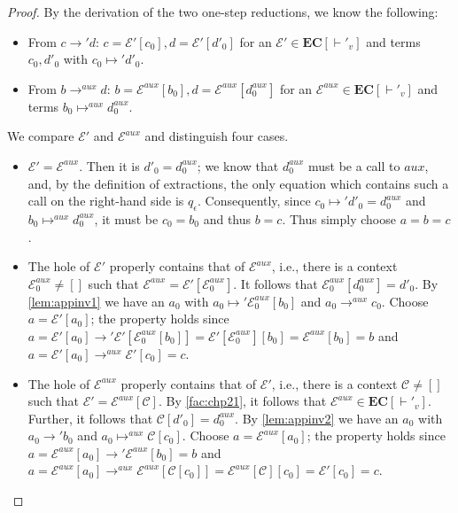 \comminv*
\begin{proof}

By the derivation of the two one-step reductions, we know the following:
\begin{itemize}
\item From $c \longrightarrow' d$: $c = \mathcal{E}'[c_0], d = \mathcal{E}'[d'_0]$ for an $\mathcal{E}' \in \mathbf{EC}[\vdash'_v]$ and terms $c_0, d'_0$ with $c_0 \mapsto' d'_0$.

\item From $b \longrightarrow^{aux} d$: $b = \mathcal{E}^{aux}[b_0], d = \mathcal{E}^{aux}[d^{aux}_0]$ for an $\mathcal{E}^{aux} \in \mathbf{EC}[\vdash'_v]$ and terms $b_0 \mapsto^{aux} d^{aux}_0$.
\end{itemize}

We compare $\mathcal{E}'$ and $\mathcal{E}^{aux}$ and distinguish four cases.

\begin{itemize}
\item $\mathcal{E}' = \mathcal{E}^{aux}$. Then it is $d'_0 = d^{aux}_0$; we know that $d^{aux}_0$ must be a call to $aux$, and, by the definition of extractions, the only equation which contains such a call on the right-hand side is $q_\epsilon$. Consequently, since $c_0 \mapsto' d'_0 = d^{aux}_0$ and $b_0 \mapsto^{aux} d^{aux}_0$, it must be $c_0 = b_0$ and thus $b = c$. Thus simply choose $a = b = c$.

\item The hole of $\mathcal{E}'$ properly contains that of $\mathcal{E}^{aux}$, i.e., there is a context $\mathcal{E}^{aux}_0 \neq []$ such that $\mathcal{E}^{aux} = \mathcal{E}'[\mathcal{E}^{aux}_0]$. It follows that $\mathcal{E}^{aux}_0[d^{aux}_0] = d'_0$. By \autoref{lem:appinv1} we have an $a_0$ with $a_0 \mapsto' \mathcal{E}^{aux}_0[b_0]$ and $a_0 \longrightarrow^{aux} c_0$. Choose $a = \mathcal{E}'[a_0]$; the property holds since $a = \mathcal{E}'[a_0] \longrightarrow' \mathcal{E}'[\mathcal{E}^{aux}_0[b_0]] = \mathcal{E}'[\mathcal{E}^{aux}_0][b_0] = \mathcal{E}^{aux}[b_0] = b$ and $a = \mathcal{E}'[a_0] \longrightarrow^{aux} \mathcal{E}'[c_0] = c$.

\item The hole of $\mathcal{E}^{aux}$ properly contains that of $\mathcal{E}'$, i.e., there is a context $\mathcal{C} \neq []$ such that $\mathcal{E}' = \mathcal{E}^{aux}[\mathcal{C}]$. By \autoref{fac:chp21}, it follows that $\mathcal{E}^{aux} \in \mathbf{EC}[\vdash'_v]$. Further, it follows that $\mathcal{C}[d'_0] = d^{aux}_0$. By \autoref{lem:appinv2} we have an $a_0$ with $a_0 \longrightarrow' b_0$ and $a_0 \mapsto^{aux} \mathcal{C}[c_0]$. Choose $a = \mathcal{E}^{aux}[a_0]$; the property holds since $a = \mathcal{E}^{aux}[a_0] \longrightarrow' \mathcal{E}^{aux}[b_0] = b$ and $a = \mathcal{E}^{aux}[a_0] \longrightarrow^{aux} \mathcal{E}^{aux}[\mathcal{C}[c_0]] = \mathcal{E}^{aux}[\mathcal{C}][c_0] = \mathcal{E}'[c_0] = c$.


\end{itemize}
\end{proof}
